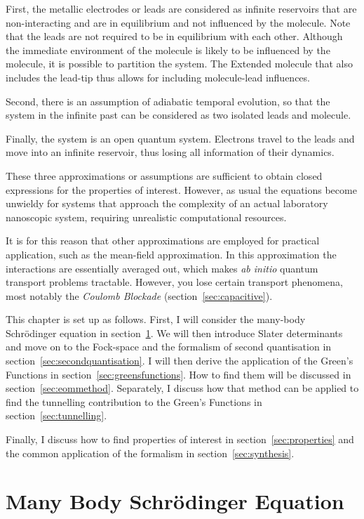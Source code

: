 First, the metallic electrodes or leads are considered as infinite reservoirs that are non\hyp{}interacting and are in equilibrium and not influenced by the molecule. Note that the leads are not required to be in equilibrium with each other. Although the immediate environment of the molecule is likely to be influenced by the molecule, it is possible to partition the system. The Extended molecule that also includes the lead-tip thus allows for including  molecule-lead influences.

Second, there is an assumption of adiabatic temporal evolution, so that the system in the infinite past can be considered as two isolated leads and molecule.  

Finally, the system is an open quantum system. Electrons travel to the leads and move into an infinite reservoir, thus losing all information of their dynamics. 

These three approximations or assumptions are sufficient to obtain closed expressions for the properties of interest. However, as usual the equations become unwieldy for systems that approach the complexity of an actual laboratory nanoscopic system, requiring unrealistic computational resources.

It is for this reason that other approximations are employed for practical application, such as the mean-field approximation. In this approximation the interactions are essentially averaged out, which makes \emph{ab initio} quantum transport problems tractable. However, you lose certain transport phenomena, most notably the \emph{Coulomb Blockade} (section~\ref{sec:capacitive}).

This chapter is set up as follows. First, I will consider the many-body Schr\"odinger equation in section~\ref{sec:schrodinger}. We will then introduce Slater determinants and move on to the Fock-space and the formalism of second quantisation in section~\ref{sec:secondquantisation}. I will then derive the application of the Green's Functions in section~\ref{sec:greensfunctions}. How to find them will be discussed in section~\ref{sec:eommethod}. Separately, I discuss how that method can be applied to find the tunnelling contribution to the Green's Functions in section~\ref{sec:tunnelling}.

Finally, I discuss how to find properties of interest in section~\ref{sec:properties} and the common application of the formalism in section~\ref{sec:synthesis}.

\section{Many Body Schr\"odinger Equation}
\label{sec:schrodinger}

